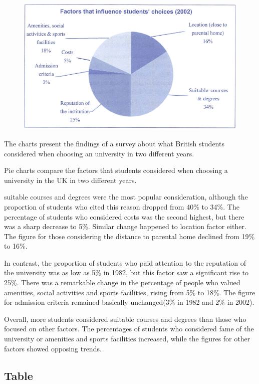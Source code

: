 \documentclass[conference]{IEEEtran}
\begin{document}
\begin{figure}[htbp]
    \centerline{\includegraphics[width=1.0\columnwidth]{images/Screenshot from 2022-12-04 17-38-13.png}}
\end{figure}

The charts present the findings of a survey about what British students considered when choosing an university in two different years.

Pie charts compare the factors that students considered when choosing a university in the UK in two different years. 

suitable courses and degrees were the most popular consideration, although the proportion of students who cited this reason dropped from 40\% to 34\%. 
The percentage of students who considered costs was the second highest, but there was a sharp decrease to 5\%. 
Similar change happened to location factor either. The figure for those considering the distance to parental home declined from 19\% to 16\%.

In contrast, the proportion of students who paid attention to the reputation of the university was as low as 5\% in 1982, 
but this factor saw a significant rise to 25\%. 
There was a remarkable change in the percentage of people who valued amenities, social activities and sports facilities, rising from 5\% to 18\%. 
The figure for admission criteria remained basically unchanged(3\% in 1982 and 2\% in 2002).

Overall, more students considered suitable courses and degrees than those who focused on other factors. 
The percentages of students who considered fame of the university or amenities and sports facilities increased, 
while the figures for other factors showed opposing trends.

\subsection{Table}
\end{document}
